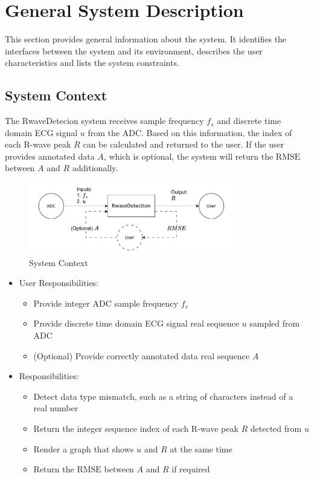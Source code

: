 \documentclass[12pt]{article}
\begin{document}
\section{General System Description}

This section provides general information about the system.  It identifies the
interfaces between the system and its environment, describes the user
characteristics and lists the system constraints.

\subsection{System Context}

The RwaveDetecion system receives sample frequency $f_s$ and discrete time
domain ECG signal $u$ from the ADC.  Based on this information, the index of
each R-wave peak $R$ can be calculated and returned to the user.  If the user
provides annotated data $A$, which is optional, the system will return the
$\text{RMSE}$ between $A$ and $R$ additionally.

\begin{figure}[h!]
\begin{center}
 \includegraphics[width=0.8\textwidth]{SystemContextFigure}
\caption{System Context}
\label{Fig_SystemContext} 
\end{center}
\end{figure}

\begin{itemize}
\item User Responsibilities:
\begin{itemize}
\item Provide integer ADC sample frequency $f_s$
\item Provide discrete time domain ECG signal real sequence $u$ sampled from ADC
\item (Optional) Provide correctly annotated data real sequence $A$
\end{itemize}
\item \progname{} Responsibilities:
\begin{itemize}
\item Detect data type mismatch, such as a string of characters instead of a
  real number
\item Return the integer sequence index of each R-wave peak $R$ detected from
$u$
\item Render a graph that shows $u$ and $R$ at the same time
\item Return the $\text{RMSE}$ between $A$ and $R$ if required
\end{itemize}
\end{itemize}
\end{document}
